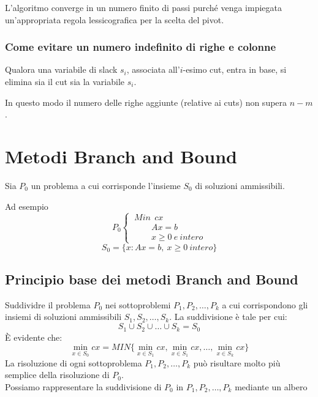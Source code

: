 L'algoritmo converge in un numero finito di passi purché venga impiegata un'appropriata regola lessicografica per la scelta del pivot.

\subsubsection{Come evitare un numero indefinito di righe e colonne}
Qualora una variabile di slack $s_{i}$, associata all'$i$-esimo cut, entra in base, si elimina sia il cut sia la variabile $s_{i}$.

In questo modo il numero delle righe aggiunte (relative ai cuts) non supera $n-m$.

\section{Metodi Branch and Bound}
Sia $P_{0}$ un problema a cui corrisponde l'insieme $S_{0}$ di soluzioni ammissibili.

Ad esempio
\begin{displaymath}
P_{0}
\begin{cases}
\ Min\ \ cx\\
\ \ \ \ \ \ \ \ \ \ A x = b\\
\ \ \ \ \ \ \ \ \ \ x \ge 0\ e\:intero
\end{cases}
\end{displaymath}
\begin{equation*}
	S_{0}=\{x:Ax=b,\ x\ge 0\ intero\}
\end{equation*}

\subsection{Principio base dei metodi Branch and Bound}
Suddividre il problema $P_{0}$ nei sottoproblemi $P_{1},P_{2},\dots,P_{k}$ a cui corrispondono gli insiemi di soluzioni ammissibili $S_{1},S_{2},\dots,S_{k}$. La suddivisione è tale per cui:
\begin{equation*}
S_{1} \cup S_{2} \cup \dots \cup S_{k} = S_{0}
\end{equation*}
È evidente che:
\begin{equation*}
\min_{x \in S_{0}} cx = MIN\{\min_{x\in S_{1}} cx, \min_{x\in S_{1}}cx,\dots,\min_{x\in S_{k}}cx\}
\end{equation*}
La risoluzione di ogni sottoproblema $P_{1},P_{2},\dots,P_{k}$ può risultare molto più semplice della risoluzione di $P_{0}$.\\
Possiamo rappresentare la suddivisione di $P_{0}$ in $P_{1},P_{2},\dots,P_{k}$ mediante un albero

